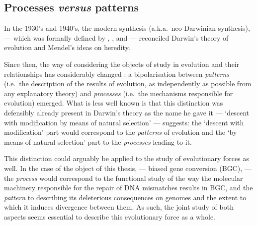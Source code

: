 \subsection{Processes \textit{versus} patterns} 

In the 1930's and 1940's, the modern synthesis (a.k.a.\ neo-Darwinian synthesis), — which was formally defined by \citet{dobzhansky1937genetic}, \citet{huxley1942evolution}, \citet{mayr1942systematics} and \citet{simpson1944tempo} — reconciled Darwin's theory of evolution and Mendel's ideas on heredity.

Since then, the way of considering the objects of study in evolution and their relationships has considerably changed \citep[reviewed in][]{paulin2015epistemologie}: a bipolarisation between \textit{patterns} (i.e.\ the description of the results of evolution, as independently as possible from any explanatory theory) and \textit{processes} (i.e.\ the mechanisms responsible for evolution) emerged.
What is less well known is that this distinction was defensibly already present in Darwin's theory \citep{gayon2018connaissance} as the name he gave it — ‘descent with modification by means of natural selection’ — suggests: the ‘descent with modification’ part would correspond to the \textit{patterns} of evolution and the ‘by means of natural selection’ part to the \textit{processes} leading to it.

This distinction could arguably be applied to the study of evolutionary forces as well.
In the case of the object of this thesis, — biased gene conversion (BGC), — the \textit{process} would correspond to the functional study of the way the molecular machinery responsible for the repair of DNA mismatches results in BGC, and the \textit{pattern} to describing its deleterious consequences on genomes and the extent to which it induces divergence between them.
As such, the joint study of both aspects seems essential to describe this evolutionary force as a whole.

